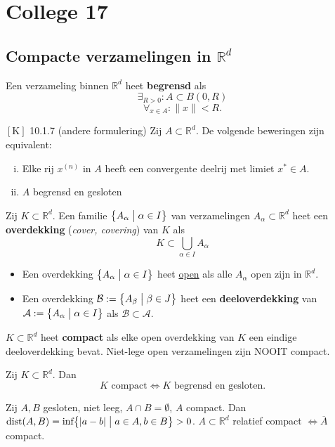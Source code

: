 \documentclass{2wa40summary}
\begin{document}
\section{College 17}
	\subsection{Compacte verzamelingen in $\mathbb{R}^d$}
		 Een verzameling binnen $\mathbb{R}^d$ heet \textbf{begrensd} als \[\exists _{R>0}: A \subset B(0,R)\]
		\[\forall _{x\in A}: \|x\|<R.\]
		
		\theorem $\left[\text{K}\right]$ 10.1.7 (andere formulering)
			  Zij $A \subset \mathbb{R}^d$. De volgende beweringen zijn equivalent:
			\begin{enumerate}[(i)]
				\item Elke rij $x^{(n)}$ in $A$ heeft een convergente deelrij met limiet $x^* \in A$.
				\item $A$ begrensd en gesloten
			\end{enumerate}
		
		 Zij $K \subset \mathbb{R}^d$. Een familie $\big\{A_\alpha \bigm| \alpha \in I \big\}$ van verzamelingen $A_\alpha \subset \mathbb{R}^d$ heet een \textbf{overdekking} (\textit{cover, covering}) van $K$ als \[K \subset \bigcup_{\alpha \in I}A_\alpha\]
		
		\begin{itemize}
			\item Een overdekking $\big\{ A_\alpha \bigm| \alpha \in I \big\}$ heet \underline{open} als alle $A_\alpha$ open zijn in $\mathbb{R}^d$.
			\item Een overdekking $\mathcal{B}:=\big\{ A_\beta \bigm| \beta \in J\big\}$ heet een \textbf{deeloverdekking} van $\mathcal{A}:=\big\{ A_\alpha \bigm| \alpha \in I \big\}$ als $\mathcal{B} \subset \mathcal{A}$.
		\end{itemize}
		
		 $K \subset \mathbb{R}^d$ heet \textbf{compact} als elke open overdekking van $K$ een eindige deeloverdekking bevat.
		\note Niet-lege open verzamelingen zijn NOOIT compact.
		
			Zij $K \subset \mathbb{R}^d$. Dan \[K \text{ compact}\Leftrightarrow K \text{ begrensd en gesloten.}\]
			
		\theorem Zij $A,B$ gesloten, niet leeg, $A\cap B = \emptyset$, $A$ compact.
			  Dan $\text{dist}(A,B) = \text{inf}\big\{ |a-b| \bigm| a \in A, b \in B \big\} > 0$.
			\opm $A \subset \mathbb{R}^d$ relatief compact $\Leftrightarrow \overline{A}$ compact.
\end{document}
